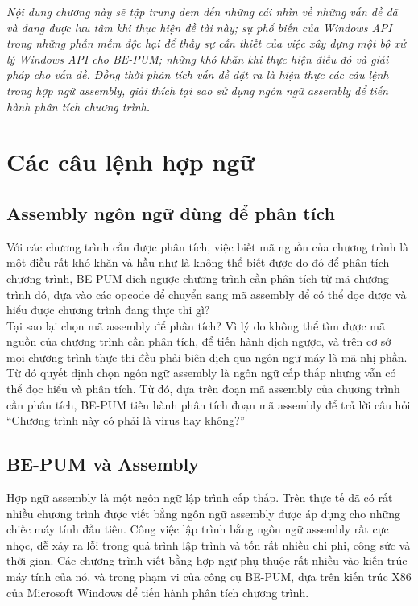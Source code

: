 \begin{concept}[15cm]
\textit{Nội dung chương này sẽ tập trung đem đến những cái nhìn về những vấn đề đã và đang được lưu tâm khi thực hiện đề tài này; sự phổ biến của Windows API trong những phần mềm độc hại để thấy sự cần thiết của việc xây dựng một bộ xử lý Windows API cho BE-PUM; những khó khăn khi thực hiện điều đó và giải pháp cho vấn đề. Đồng thời phân tích vấn đề đặt ra là hiện thực các câu lệnh trong hợp ngữ assembly, giải thích tại sao sử dụng ngôn ngữ assembly để tiến hành phân tích chương trình.}
\end{concept}

\section{Các câu lệnh hợp ngữ}

  \subsection{Assembly ngôn ngữ dùng để phân tích }

  Với các chương trình cần được phân tích, việc biết mã nguồn của chương trình là một điều rất khó khăn và hầu như là không thể biết được do đó để phân tích chương trình, BE-PUM dich ngược chương trình cần phân tích từ mã chương trình đó, dựa vào các opcode để chuyển sang mã assembly để có thể đọc được và hiểu được chương trình đang thực thi gì?\\

Tại sao lại chọn mã assembly để phân tích? Vì lý do không thể tìm được mã nguồn của chương trình cần phân tích, để tiến hành dịch ngược, và trên cơ sở mọi chương trình thực thi đều phải biên dịch qua ngôn ngữ máy là mã nhị phần. Từ đó quyết định chọn ngôn ngữ assembly là ngôn ngữ cấp thấp nhưng vẫn có thể đọc hiểu và phân tích. Từ đó, dựa trên đoạn mã assembly của chương trình cần phân tích, BE-PUM tiến hành phân tích đoạn mã assembly để trả lời câu hỏi “Chương trình này có phải là virus hay không?”

  \subsection{BE-PUM và Assembly}
  Hợp ngữ assembly là một ngôn ngữ lập trình cấp thấp. Trên thực tế đã có rất nhiều chương trình được viết bằng ngôn ngữ assembly được áp dụng cho những chiếc máy tính đầu tiên. Công việc lập trình bằng ngôn ngữ assembly rất cực nhọc, dễ xảy ra lỗi trong quá trình lập trình và tốn rất nhiều chi phi, công sức và thời gian. Các chương trình viết bằng hợp ngữ phụ thuộc rất nhiều vào kiến trúc máy tính của nó, và trong phạm vi của công cụ BE-PUM, dựa trên kiến trúc X86 của Microsoft Windows để tiến hành phân tích chương trình.\\

